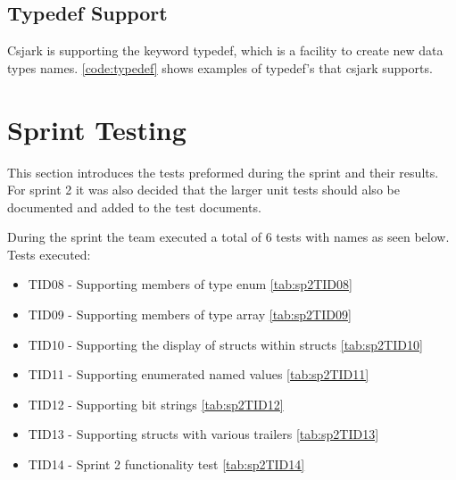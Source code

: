 



\subsection{Typedef Support}
Csjark is supporting the keyword typedef, which is a facility to create new 
data types names. \autoref{code:typedef} shows examples of typedef's that 
csjark supports.



\section{Sprint Testing}
This section introduces the tests preformed during the sprint and their results. For sprint 2 it was also decided that the larger unit tests should also be documented and added to the test documents.

During the sprint the team executed a total of 6 tests with names as seen below. Tests executed:
\begin{itemize}
	\item TID08 - Supporting members of type enum \autoref{tab:sp2TID08}
	\item TID09 - Supporting members of type array  \autoref{tab:sp2TID09}
	\item TID10 - Supporting the display of structs within structs  \autoref{tab:sp2TID10}
	\item TID11 - Supporting enumerated named values  \autoref{tab:sp2TID11}
	\item TID12 - Supporting bit strings  \autoref{tab:sp2TID12}
	\item TID13 - Supporting structs with various trailers \autoref{tab:sp2TID13}
	\item TID14 - Sprint 2 functionality test \autoref{tab:sp2TID14}
\end{itemize}

